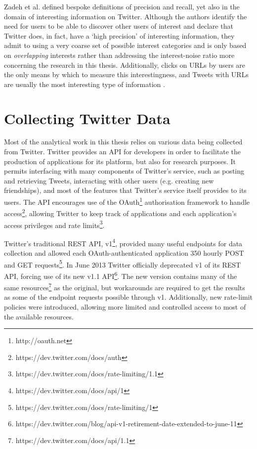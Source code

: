 Zadeh et al. \cite{zadeh13} defined bespoke definitions of precision and recall, yet also in the domain of interesting information on Twitter. Although the authors identify the need for users to be able to discover other users of interest and declare that Twitter does, in fact, have a `high precision' of interesting information, they admit to using a very coarse set of possible interest categories and is only based on \textit{overlapping} interests rather than addressing the interest-noise ratio more concerning the research in this thesis. Additionally, clicks on URLs by users are the only means by which to measure this interestingness, and Tweets with URLs are usually the most interesting type of information \cite{alonso10}.





\section{Collecting Twitter Data}
Most of the analytical work in this thesis relies on various data being collected from Twitter. Twitter provides an API for developers in order to facilitate the production of applications for its platform, but also for research purposes. It permits interfacing with many components of Twitter's service, such as posting and retrieving Tweets, interacting with other users (e.g. creating new friendships), and most of the features that Twitter's service itself provides to its users. The API encourages use of the OAuth\footnote{http://oauth.net} authorisation framework to handle access\footnote{https://dev.twitter.com/docs/auth}, allowing Twitter to keep track of applications and each application's access privileges and rate limits\footnote{https://dev.twitter.com/docs/rate-limiting/1.1}.

Twitter's traditional REST API, v1\footnote{https://dev.twitter.com/docs/api/1}, provided many useful endpoints for data collection and allowed each OAuth-authenticated application 350 hourly POST and GET requests\footnote{https://dev.twitter.com/docs/rate-limiting/1}. In June 2013 Twitter officially deprecated v1 of its REST API, forcing use of its new v1.1 API\footnote{https://dev.twitter.com/blog/api-v1-retirement-date-extended-to-june-11}. The new version contains many of the same resources\footnote{https://dev.twitter.com/docs/api/1.1} as the original, but workarounds are required to get the results as some of the endpoint requests possible through v1. Additionally, new rate-limit policies were introduced, allowing more limited and controlled access to most of the available resources.

